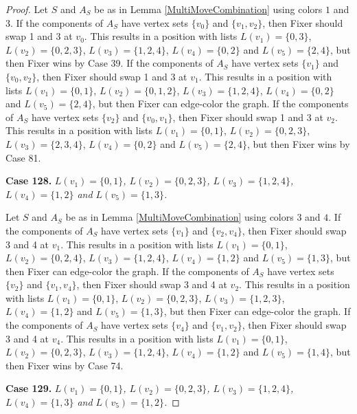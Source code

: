 \documentclass[12pt]{amsart}
\theoremstyle{plain}
\theoremstyle{definition}
\theoremstyle{remark}
\begin{document}
\begin{proof}
Let $S$ and $A_S$ be as in Lemma \ref{MultiMoveCombination} using colors $1$ and $3$. If the components of $A_S$ have vertex sets $\{v_0\}$ and $\{v_1, v_2\}$, then Fixer should swap 1 and 3 at $v_0$. This results in a position with lists $L(v_1) = \{0, 3\}$, $L(v_2) = \{0, 2, 3\}$, $L(v_3) = \{1, 2, 4\}$, $L(v_4) = \{0, 2\}$ and $L(v_5) = \{2, 4\}$, but then Fixer wins by Case 39.
If the components of $A_S$ have vertex sets $\{v_1\}$ and $\{v_0, v_2\}$, then Fixer should swap 1 and 3 at $v_1$. This results in a position with lists $L(v_1) = \{0, 1\}$, $L(v_2) = \{0, 1, 2\}$, $L(v_3) = \{1, 2, 4\}$, $L(v_4) = \{0, 2\}$ and $L(v_5) = \{2, 4\}$, but then Fixer can edge-color the graph.
If the components of $A_S$ have vertex sets $\{v_2\}$ and $\{v_0, v_1\}$, then Fixer should swap 1 and 3 at $v_2$. This results in a position with lists $L(v_1) = \{0, 1\}$, $L(v_2) = \{0, 2, 3\}$, $L(v_3) = \{2, 3, 4\}$, $L(v_4) = \{0, 2\}$ and $L(v_5) = \{2, 4\}$, but then Fixer wins by Case 81.

\noindent\textbf{Case 128.  }\textit{$L(v_1) = \{0, 1\}$, $L(v_2) = \{0, 2, 3\}$, $L(v_3) = \{1, 2, 4\}$, $L(v_4) = \{1, 2\}$ and $L(v_5) = \{1, 3\}$.}

Let $S$ and $A_S$ be as in Lemma \ref{MultiMoveCombination} using colors $3$ and $4$. If the components of $A_S$ have vertex sets $\{v_1\}$ and $\{v_2, v_4\}$, then Fixer should swap 3 and 4 at $v_1$. This results in a position with lists $L(v_1) = \{0, 1\}$, $L(v_2) = \{0, 2, 4\}$, $L(v_3) = \{1, 2, 4\}$, $L(v_4) = \{1, 2\}$ and $L(v_5) = \{1, 3\}$, but then Fixer can edge-color the graph.
If the components of $A_S$ have vertex sets $\{v_2\}$ and $\{v_1, v_4\}$, then Fixer should swap 3 and 4 at $v_2$. This results in a position with lists $L(v_1) = \{0, 1\}$, $L(v_2) = \{0, 2, 3\}$, $L(v_3) = \{1, 2, 3\}$, $L(v_4) = \{1, 2\}$ and $L(v_5) = \{1, 3\}$, but then Fixer can edge-color the graph.
If the components of $A_S$ have vertex sets $\{v_4\}$ and $\{v_1, v_2\}$, then Fixer should swap 3 and 4 at $v_4$. This results in a position with lists $L(v_1) = \{0, 1\}$, $L(v_2) = \{0, 2, 3\}$, $L(v_3) = \{1, 2, 4\}$, $L(v_4) = \{1, 2\}$ and $L(v_5) = \{1, 4\}$, but then Fixer wins by Case 74.

\noindent\textbf{Case 129.  }\textit{$L(v_1) = \{0, 1\}$, $L(v_2) = \{0, 2, 3\}$, $L(v_3) = \{1, 2, 4\}$, $L(v_4) = \{1, 3\}$ and $L(v_5) = \{1, 2\}$.}


\end{proof}
\end{document}
